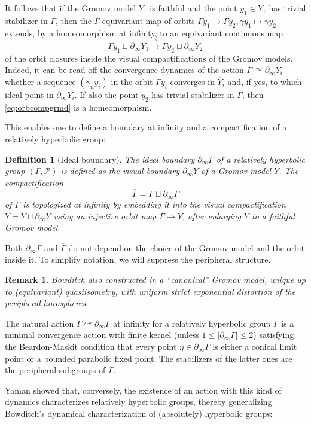 \documentclass[12pt]{article}
\theoremstyle{boldplain}
\theoremstyle{bolddefinition}
\newtheorem{definition}[equation]{Definition}
\newtheorem{rem}[equation]{Remark}
\numberwithin{equation}{section}
\def\ga{\gamma}
\def\Ga{\Gamma}
\def\acts{\curvearrowright}
\def\geo{\partial_{\infty}}
\def\lra{\longrightarrow}
\def\ol{\overline}
\begin{document}
It follows that if the Gromov model $Y_1$ is faithful 
and the point $y_1\in Y_1$ has trivial stabilizer in $\Ga$,
then the $\Ga$-equivariant map of orbits $\Ga y_1\to\Ga y_2,\ga y_1\mapsto\ga y_2$ 
extends, by a homeomorphism at infinity, to an equivariant continuous map
\begin{equation}
\label{eq:orbcompgrmd}
\Ga y_1\sqcup\geo Y_1\stackrel{\cong}{\lra} \Ga y_2\sqcup\geo Y_2
\end{equation}
of the orbit closures inside the visual compactifications of the Gromov models.
Indeed, it can be read off the convergence dynamics of the action $\Ga\acts\geo Y_i$
whether a sequence $(\ga_ny_i)$ in the orbit $\Ga y_i$ converges in $\ol Y_i$ and, if yes, to which ideal point in $\geo Y_i$.
If also the point $y_2$ has trivial stabilizer in $\Ga$,
then \eqref{eq:orbcompgrmd} is a homeomorphism. 

This enables one to define a boundary at infinity and a compactification of a relatively hyperbolic group:

\begin{definition}[Ideal boundary]
The {\em ideal boundary} 
$\geo\Ga$ of a relatively hyperbolic group $(\Ga, {\mathcal P})$
is defined as the visual boundary $\geo Y$ of a Gromov model $Y$.
The {\em compactification} 
$$\ol\Ga=\Ga\sqcup\geo\Ga$$ of $\Ga$ is topologized at infinity by embedding it into the 
visual compactification $\ol Y=Y\sqcup\geo Y$ 
using an injective orbit map $\Ga\to Y$,
after enlarging $Y$ to a faithful Gromov model.
\end{definition}
Both $\geo \Ga$ and $\ol{\Ga}$ do not depend on the choice of the Gromov model and the orbit inside it.
To simplify notation, we will suppress the peripheral structure. 

\begin{rem}
Bowditch also constructed in \cite{Bowditch2012} 
a ``canonical'' Gromov model, unique up to (equivariant) quasiisometry,
with uniform {\em strict} exponential distortion of the peripheral horospheres. 
\end{rem}

The natural action $\Ga\acts\geo \Ga$ at infinity for a relatively hyperbolic group $\Ga$ 
is a minimal convergence action with finite kernel (unless $1\le |\geo \Ga|\le 2$) 
satisfying the Beardon-Maskit condition 
that every point $\eta\in \geo \Ga$ is either a conical limit point or a bounded parabolic fixed point. 
The stabilizers of the latter ones are the peripheral subgroups of $\Ga$.

Yaman showed that, conversely, 
the existence of an action with 
this kind of dynamics characterizes relatively hyperbolic groups,
thereby generalizing Bowditch's dynamical characterization of (absolutely) hyperbolic groups:
\end{document}
